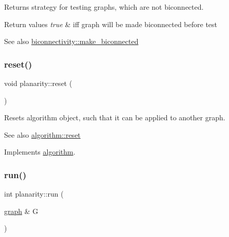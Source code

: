 Returns strategy for testing graphs, which are not biconnected. 


\begin{DoxyRetVals}{Return values}
{\em true} & iff graph will be made biconnected before test\\
\hline
\end{DoxyRetVals}
\begin{DoxySeeAlso}{See also}
\mbox{\hyperlink{classbiconnectivity_a774fd08203a6d164605afc4cdc8b9201}{biconnectivity\+::make\+\_\+biconnected}} 
\end{DoxySeeAlso}
\mbox{\label{classplanarity_aca500e3d46a99c6231aff86afa2a71b1}} 
\subsubsection{\texorpdfstring{reset()}{reset()}}
{\footnotesize\ttfamily void planarity\+::reset (\begin{DoxyParamCaption}{ }\end{DoxyParamCaption})\hspace{0.3cm}{\ttfamily [virtual]}}



Resets algorithm object, such that it can be applied to another graph. 

\begin{DoxySeeAlso}{See also}
\mbox{\hyperlink{classalgorithm_a21aba63d066ae7897de6ca7d8425c408}{algorithm\+::reset}} 
\end{DoxySeeAlso}


Implements \mbox{\hyperlink{classalgorithm_a21aba63d066ae7897de6ca7d8425c408}{algorithm}}.

\mbox{\label{classplanarity_a93232e765c08dd2a4c00d192bb48b5fc}} 
\subsubsection{\texorpdfstring{run()}{run()}}
{\footnotesize\ttfamily int planarity\+::run (\begin{DoxyParamCaption}\item[{\mbox{\hyperlink{classgraph}{graph}} \&}]{G }\end{DoxyParamCaption})\hspace{0.3cm}{\ttfamily [virtual]}}



